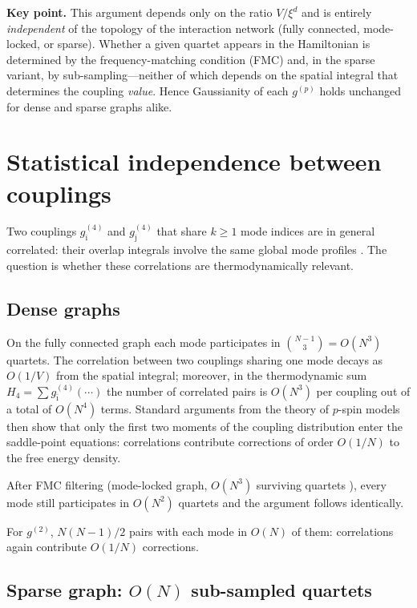 \documentclass[11pt,a4paper]{article}
\begin{document}
\noindent
\textbf{Key point.}  This argument depends only on the ratio
$V/\xi^d$ and is entirely \emph{independent} of the topology of the
interaction network (fully connected, mode-locked, or sparse).
Whether a given quartet appears in the Hamiltonian is determined by
the frequency-matching condition (FMC) and, in the sparse variant,
by sub-sampling---neither of which depends on the spatial integral
that determines the coupling \emph{value}.  Hence Gaussianity of
each $g^{(p)}$ holds unchanged for dense and sparse graphs alike.

\section{Statistical independence between couplings}

Two couplings $g^{(4)}_{\bar\imath}$ and $g^{(4)}_{\bar\jmath}$
that share $k\ge1$ mode indices are in general correlated: their
overlap integrals involve the same global mode profiles
\cite{Zaitsev2010}.  The question is whether these correlations are
thermodynamically relevant.

\subsection{Dense graphs}

On the fully connected graph each mode participates in
$\binom{N-1}{3}=O(N^3)$ quartets.  The correlation between two
couplings sharing one mode decays as $O(1/V)$ from the spatial
integral; moreover, in the thermodynamic sum
$H_4=\sum g^{(4)}_{\bar\imath}(\cdots)$ the number of correlated
pairs is $O(N^3)$ per coupling out of a total of $O(N^4)$ terms.
Standard arguments from the theory of $p$-spin models
\cite{MPV1987,CrisantiSommers1995} then show that only the first
two moments of the coupling distribution enter the saddle-point
equations: correlations contribute corrections of order $O(1/N)$
to the free energy density.

After FMC filtering (mode-locked graph, $O(N^3)$ surviving quartets
\cite{Marruzzo2018}), every mode still participates in $O(N^2)$
quartets and the argument follows identically.

For $g^{(2)}$, $N(N-1)/2$ pairs with each mode in $O(N)$ of
them: correlations again contribute $O(1/N)$ corrections.

\subsection{Sparse graph: $O(N)$ sub-sampled quartets}
\end{document}
